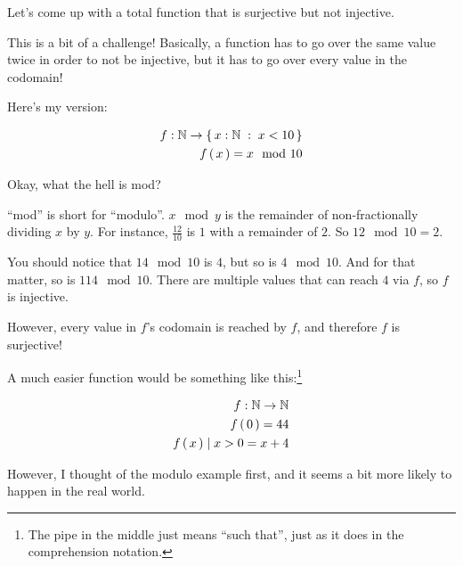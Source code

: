 \begin{example}
    Let's come up with a total function that is surjective but not injective.

    This is a bit of a challenge! Basically, a function has to go over the same
    value twice in order to not be injective, but it has to go over every value
    in the codomain!

    Here's my version:

    \begin{eqnarray}
        f : \mathbb{N} \to \left\{\, x : \mathbb{N}\; : \; x < 10 \,\right\} \\
        f \left(\, x \,\right) = x \mod{10} \\
    \end{eqnarray}

    Okay, what the hell is mod?

    ``mod'' is short for ``modulo''. $x \mod y$ is the remainder of
    non-fractionally dividing $x$ by $y$. For instance, $\frac{12}{10}$ is $1$
    with a remainder of $2$. So $12 \mod{10} = 2$.

    You should notice that $14 \mod{10}$ is $4$, but so is $4 \mod{10}$. And for
    that matter, so is $114 \mod{10}$. There are multiple values that can reach
    $4$ via $f$, so $f$ is  injective.

    However, every value in $f$'s codomain is reached by $f$, and therefore $f$
    is surjective!

    A much easier function would be something like this:\footnote{The pipe in
      the middle just means ``such that'', just as it does in the comprehension
      notation.}

    \begin{eqnarray}
        f : \mathbb{N} \to \mathbb{N} \\
        f \left(\, 0 \,\right) = 44 \\
        f \left(\, x \,\right) \mid x > 0 = x + 4 \\
    \end{eqnarray}

    However, I thought of the modulo example first, and it seems a bit more
    likely to happen in the real world.
\end{example}

